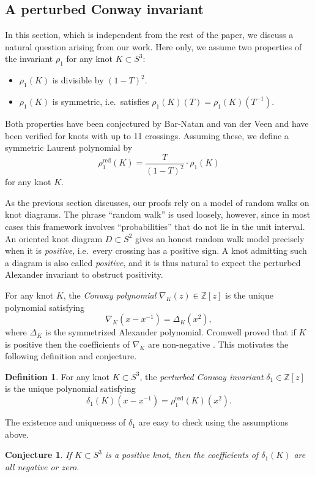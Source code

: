 \documentclass[11pt,hyp,]{nyjm}
\newcommand{\Z}{\mathbb{Z}}
\numberwithin{thm}{section}
\newtheorem{conj}[thm]{Conjecture}
\theoremstyle{definition}
\newtheorem{defn}[thm]{Definition}
\theoremstyle{remark}
\begin{document}
	
	\subsection{A perturbed Conway invariant}
	
	In this section, which is independent from the rest of the paper, we discuss a natural question arising from our work. Here only, we assume two properties of the invariant $\rho_1$ for any knot $K \subset S^3$:
	\begin{itemize}
		\item $\rho_1(K)$ is divisible by $(1 - T)^2$.
		\item $\rho_1(K)$ is symmetric, i.e.~satisfies $\rho_1(K)(T) = \rho_1(K)(T^{-1})$.
	\end{itemize}
	Both properties have been conjectured by Bar-Natan and van der Veen  \cite{bnvdv21} and have been verified for knots with up to 11 crossings. Assuming these, we define a symmetric Laurent polynomial by
	$$
	\rho_1^\text{red}(K) = \frac{T}{(1 - T)^2} \cdot \rho_1(K)
	$$
	for any knot $K$.
	
	 As the previous section discusses, our proofs rely on a model of random walks on knot diagrams. The phrase ``random walk'' is used loosely, however, since in most cases this framework involves ``probabilities'' that do not lie in the unit interval. An oriented knot diagram $D \subset S^2$ gives an honest random walk model precisely when it is {\em positive}, i.e.~every crossing has a positive sign. A knot admitting such a diagram is also called {\em positive}, and it is thus natural to expect the perturbed Alexander invariant to obstruct positivity.
	
	For any knot $K$, the {\em Conway polynomial} $\nabla_K(z) \in \Z[z]$ is the unique polynomial satisfying
	$$
	\nabla_K(x - x^{-1}) = \Delta_K(x^2),
	$$
	where $\Delta_K$ is the symmetrized Alexander polynomial. Cromwell proved that if $K$ is positive then the coefficients of $\nabla_K$ are non-negative \cite[Corollary 2.1]{cro89}. This motivates the following definition and conjecture.
	
	\begin{defn}
		For any knot $K \subset S^3$, the {\em perturbed Conway invariant} $\delta_1 \in \Z[z]$ is the unique polynomial satisfying
		$$
		\delta_1(K)(x - x^{-1}) = \rho^\text{red}_1(K)(x^2).
		$$
	\end{defn}
	The existence and uniqueness of $\delta_1$ are easy to check using the assumptions above.
	
	\begin{conj}
		\label{conj:positivity}
		If $K \subset S^3$ is a positive knot, then the coefficients of $\delta_1(K)$ are all negative or zero.
	\end{conj}
\end{document}
